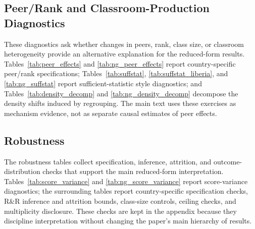 \documentclass[11pt]{article}
\begin{document}
\subsection{Peer/Rank and Classroom-Production Diagnostics}

These diagnostics ask whether changes in peers, rank, class size, or classroom heterogeneity provide an alternative explanation for the reduced-form results. Tables~\ref{tab:peer_effects} and \ref{tab:ng_peer_effects} report country-specific peer/rank specifications; Tables~\ref{tab:suffstat}, \ref{tab:suffstat_liberia}, and \ref{tab:ng_suffstat} report sufficient-statistic style diagnostics; and Tables~\ref{tab:density_decomp} and \ref{tab:ng_density_decomp} decompose the density shifts induced by regrouping. The main text uses these exercises as mechanism evidence, not as separate causal estimates of peer effects.











\subsection{Robustness}

The robustness tables collect specification, inference, attrition, and outcome-distribution checks that support the main reduced-form interpretation. Tables~\ref{tab:score_variance} and \ref{tab:ng_score_variance} report score-variance diagnostics; the surrounding tables report country-specific specification checks, R\&R inference and attrition bounds, class-size controls, ceiling checks, and multiplicity disclosure. These checks are kept in the appendix because they discipline interpretation without changing the paper's main hierarchy of results.













\end{document}
